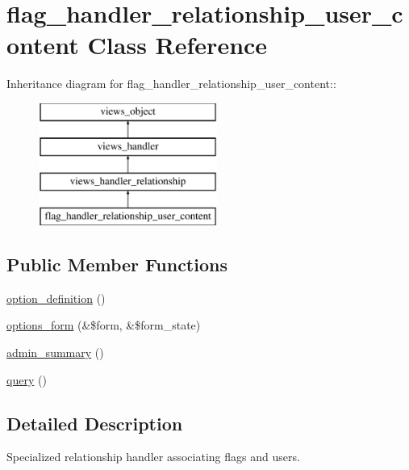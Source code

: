 \hypertarget{classflag__handler__relationship__user__content}{
\section{flag\_\-handler\_\-relationship\_\-user\_\-content Class Reference}
\label{classflag__handler__relationship__user__content}
}
Inheritance diagram for flag\_\-handler\_\-relationship\_\-user\_\-content::\begin{figure}[H]
\begin{center}
\leavevmode
\includegraphics[height=4cm]{classflag__handler__relationship__user__content}
\end{center}
\end{figure}
\subsection*{Public Member Functions}
\begin{CompactItemize}
\item 
\hyperlink{classflag__handler__relationship__user__content_2bbdef4e35eff90f4a109390bca06d95}{option\_\-definition} ()
\item 
\hyperlink{classflag__handler__relationship__user__content_21d3592facff0d6f32b52685f78259b7}{options\_\-form} (\&\$form, \&\$form\_\-state)
\item 
\hyperlink{classflag__handler__relationship__user__content_4612285c2176c18f0bcc809531ab22ee}{admin\_\-summary} ()
\item 
\hyperlink{classflag__handler__relationship__user__content_d6d40590ad33616b0a55395d60d1166b}{query} ()
\end{CompactItemize}


\subsection{Detailed Description}
Specialized relationship handler associating flags and users. 

